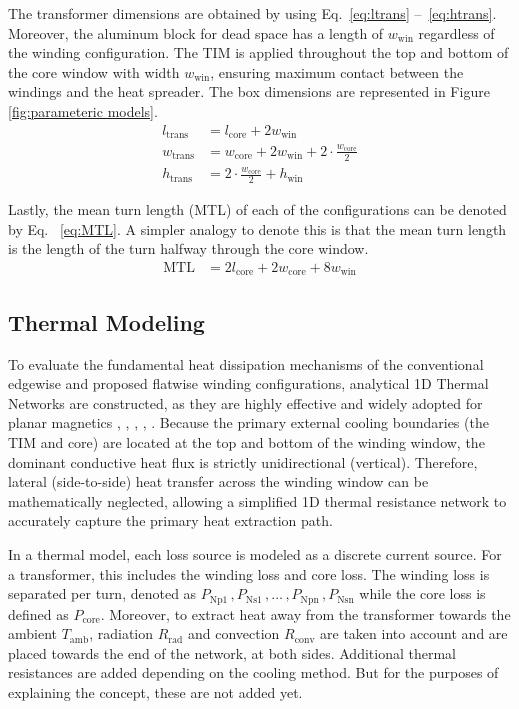 The transformer dimensions are obtained by using Eq.~\ref{eq:ltrans} --~\ref{eq:htrans}. Moreover, the aluminum block for dead space has a length of $w_{\mathrm{win}}$ regardless of the winding configuration. The TIM is applied throughout the top and bottom of the core window with width $w_{\mathrm{win}}$, ensuring maximum contact between the windings and the heat spreader. The box dimensions are represented in Figure \ref{fig:parameteric models}.
\begin{align}
    l_{\mathrm{trans}} &= l_{\mathrm{core}} + 2w_{\mathrm{win}}  \label{eq:ltrans}\\
    w_{\mathrm{trans}} &= w_{\mathrm{core}} + 2 w_{\mathrm{win}} + 2 \cdot \frac{w_\mathrm{core}}{2} \label{eq:wtrans}\\
    h_{\mathrm{trans}} &= 2 \cdot \frac{w_\mathrm{core}}{2} + h_{\mathrm{win}}\label{eq:htrans} 
\end{align}


Lastly, the mean turn length (MTL) of each of the configurations can be denoted by Eq. ~\ref{eq:MTL}. A simpler analogy to denote this is that the mean turn length is the length of the turn halfway through the core window. 
\begin{align}
    \mathrm{MTL} &= 2l_{\mathrm{core}} + 2w_{\mathrm{core}} + 8w_{\mathrm{win}} \label{eq:MTL} 
\end{align}

\subsection{Thermal Modeling}
To evaluate the fundamental heat dissipation mechanisms of the conventional edgewise and proposed flatwise winding configurations, analytical 1D Thermal Networks are constructed, as they are highly effective and widely adopted for planar magnetics \cite{ref13}, \cite{escribano2006new}, \cite{lewaiter2001thermal}, \cite{vanderlinde1991design}, \cite{chen2002volumetric}. Because the primary external cooling boundaries (the TIM and core) are located at the top and bottom of the winding window, the dominant conductive heat flux is strictly unidirectional (vertical). Therefore, lateral (side-to-side) heat transfer across the winding window can be mathematically neglected, allowing a simplified 1D thermal resistance network to accurately capture the primary heat extraction path.

In a thermal model, each loss source is modeled as a discrete current source. For a transformer, this includes the winding loss and core loss. The winding loss is separated per turn, denoted as $P_{\mathrm{Np1}}\, , P_{\mathrm{Ns1}}\, , \dots \, , P_{\mathrm{Npn}}\, , P_{\mathrm{Nsn}}$ while the core loss is defined as $P_{\mathrm{core}}$. Moreover, to extract heat away from the transformer towards the ambient $T_\mathrm{amb}$, radiation $R_\mathrm{rad}$ and convection $R_\mathrm{conv}$ are taken into account and are placed towards the end of the network, at both sides. Additional thermal resistances are added depending on the cooling method. But for the purposes of explaining the concept, these are not added yet.

